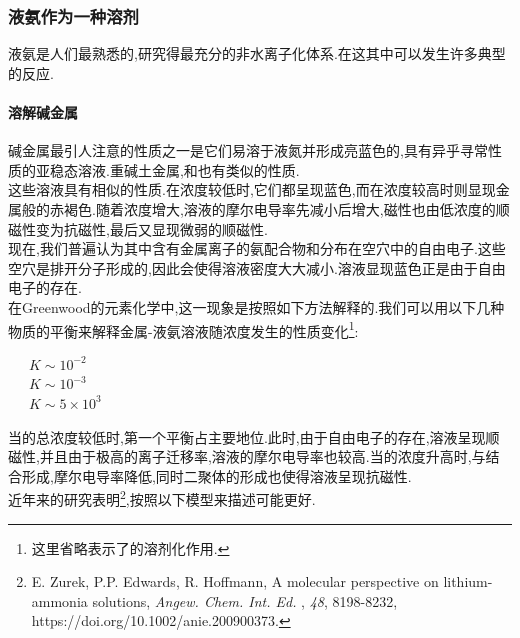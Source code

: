 \documentclass{ctexart}
\begin{document}
\subsubsection{液氨作为一种溶剂}
液氨是人们最熟悉的,研究得最充分的非水离子化体系.在这其中可以发生许多典型的反应.
\paragraph{溶解碱金属}
碱金属最引人注意的性质之一是它们易溶于液氮并形成亮蓝色的,具有异乎寻常性质的亚稳态溶液.重碱土金属,和也有类似的性质.\\
\indent 这些溶液具有相似的性质.在浓度较低时,它们都呈现蓝色,而在浓度较高时则显现金属般的赤褐色.随着浓度增大,溶液的摩尔电导率先减小后增大,磁性也由低浓度的顺磁性变为抗磁性,最后又显现微弱的顺磁性.\\
\indent 现在,我们普遍认为其中含有金属离子的氨配合物和分布在空穴中的自由电子.这些空穴是排开分子形成的,因此会使得溶液密度大大减小.溶液显现蓝色正是由于自由电子的存在.\\
\indent 在Greenwood的元素化学中,这一现象是按照如下方法解释的.我们可以用以下几种物质的平衡来解释金属-液氨溶液随浓度发生的性质变化\footnote{这里省略表示了的溶剂化作用.}:
\begin{center}
    \ \ \ $K\sim10^{-2}$\\
    \ \ \ $K\sim10^{-3}$\\
    \ \ \ $K\sim5\times10^{3}$
\end{center}
当的总浓度较低时,第一个平衡占主要地位.此时,由于自由电子的存在,溶液呈现顺磁性,并且由于极高的离子迁移率,溶液的摩尔电导率也较高.当的浓度升高时,与结合形成,摩尔电导率降低,同时二聚体的形成也使得溶液呈现抗磁性.\\
\indent 近年来的研究表明\footnote{E. Zurek, P.P. Edwards, R. Hoffmann, A molecular perspective on lithium-ammonia solutions, \textit{Angew. Chem. Int. Ed.} , \textit{48}, 8198-8232, https://doi.org/10.1002/anie.200900373.},按照以下模型来描述可能更好.
\end{document}
